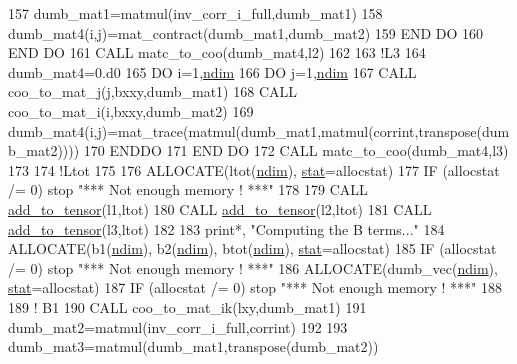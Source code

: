 \begin{DoxyCode}
157           dumb\_mat1=matmul(inv\_corr\_i\_full,dumb\_mat1)
158           dumb\_mat4(i,j)=mat\_contract(dumb\_mat1,dumb\_mat2)
159 \textcolor{keywordflow}{       END DO}
160 \textcolor{keywordflow}{    END DO}
161     \textcolor{keyword}{CALL }matc\_to\_coo(dumb\_mat4,l2)
162 
163     \textcolor{comment}{!L3}
164     dumb\_mat4=0.d0
165     \textcolor{keywordflow}{DO} i=1,\hyperlink{namespaceparams_a2323fe1773f086e20c14f266351c482b}{ndim}
166        \textcolor{keywordflow}{DO} j=1,\hyperlink{namespaceparams_a2323fe1773f086e20c14f266351c482b}{ndim}
167           \textcolor{keyword}{CALL }coo\_to\_mat\_j(j,bxxy,dumb\_mat1)
168           \textcolor{keyword}{CALL }coo\_to\_mat\_i(i,bxxy,dumb\_mat2)
169           dumb\_mat4(i,j)=mat\_trace(matmul(dumb\_mat1,matmul(corrint,transpose(dumb\_mat2))))
170 \textcolor{keywordflow}{       ENDDO}
171 \textcolor{keywordflow}{    END DO}
172     \textcolor{keyword}{CALL }matc\_to\_coo(dumb\_mat4,l3)
173 
174     \textcolor{comment}{!Ltot}
175 
176     \textcolor{keyword}{ALLOCATE}(ltot(\hyperlink{namespaceparams_a2323fe1773f086e20c14f266351c482b}{ndim}), \hyperlink{namespacestat}{stat}=allocstat)
177     \textcolor{keywordflow}{IF} (allocstat /= 0) stop \textcolor{stringliteral}{"*** Not enough memory ! ***"}
178     
179     \textcolor{keyword}{CALL }\hyperlink{namespacetensor_aad7cd55f3a4cec4676cc7ca34b05f1a8}{add\_to\_tensor}(l1,ltot)
180     \textcolor{keyword}{CALL }\hyperlink{namespacetensor_aad7cd55f3a4cec4676cc7ca34b05f1a8}{add\_to\_tensor}(l2,ltot)
181     \textcolor{keyword}{CALL }\hyperlink{namespacetensor_aad7cd55f3a4cec4676cc7ca34b05f1a8}{add\_to\_tensor}(l3,ltot)
182 
183     print*, \textcolor{stringliteral}{"Computing the B terms..."}
184     \textcolor{keyword}{ALLOCATE}(b1(\hyperlink{namespaceparams_a2323fe1773f086e20c14f266351c482b}{ndim}), b2(\hyperlink{namespaceparams_a2323fe1773f086e20c14f266351c482b}{ndim}), btot(\hyperlink{namespaceparams_a2323fe1773f086e20c14f266351c482b}{ndim}), \hyperlink{namespacestat}{stat}=allocstat)
185     \textcolor{keywordflow}{IF} (allocstat /= 0) stop \textcolor{stringliteral}{"*** Not enough memory ! ***"}
186     \textcolor{keyword}{ALLOCATE}(dumb\_vec(\hyperlink{namespaceparams_a2323fe1773f086e20c14f266351c482b}{ndim}), \hyperlink{namespacestat}{stat}=allocstat)
187     \textcolor{keywordflow}{IF} (allocstat /= 0) stop \textcolor{stringliteral}{"*** Not enough memory ! ***"}
188 
189     \textcolor{comment}{! B1}
190     \textcolor{keyword}{CALL }coo\_to\_mat\_ik(lxy,dumb\_mat1)
191     dumb\_mat2=matmul(inv\_corr\_i\_full,corrint)
192     
193     dumb\_mat3=matmul(dumb\_mat1,transpose(dumb\_mat2))

\end{DoxyCode}
